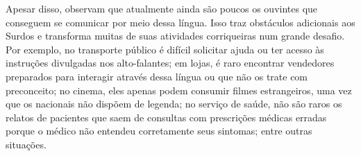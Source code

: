 

Apesar disso,  observam que atualmente ainda são poucos os ouvintes que conseguem se comunicar por meio dessa língua.
Isso traz obstáculos adicionais aos Surdos e transforma muitas de suas atividades corriqueiras num grande desafio.
Por exemplo, no transporte público é difícil solicitar ajuda ou ter acesso às instruções divulgadas nos alto-falantes;
em lojas, é raro encontrar vendedores preparados para interagir através dessa língua ou que não os trate com preconceito;
no cinema, eles apenas podem consumir filmes estrangeiros, uma vez que os nacionais não dispõem de legenda;
no serviço de saúde, não são raros os relatos de pacientes que saem de consultas com prescrições médicas erradas porque o médico não entendeu corretamente seus sintomas; entre outras situações.

